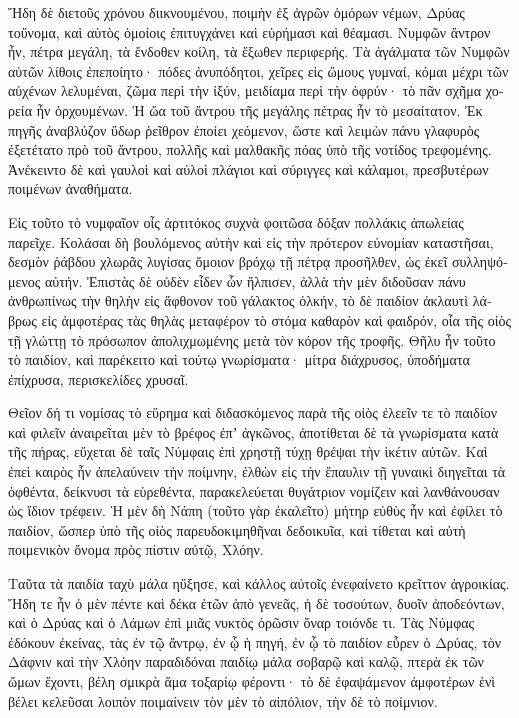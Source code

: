 \documentclass{book}
\begin{document}
\begin{pairs}
\begin{Leftside}
\begin{greek}
  Ἤδη δὲ διετοῦς χρόνου διικνουμένου, ποιμὴν ἐξ ἀγρῶν ὁμόρων νέμων, Δρύας τοὔνομα, καὶ αὐτὸς ὁμοίοις ἐπιτυγχάνει καὶ εὑρήμασι καὶ θέαμασι. Νυμφῶν ἄντρον ἦν, πέτρα μεγάλη, τὰ ἔνδοθεν κοίλη,  τὰ ἔξωθεν περιφερής. Τὰ ἀγάλματα τῶν Νυμφῶν αὐτῶν λίθοις ἐπεποίητο· πόδες ἀνυπόδητοι, χεῖρες εἰς ὤμους γυμναί, κόμαι μέχρι τῶν αὐχένων λελυμέναι, ζῶμα περὶ τὴν ἰξύν, μειδίαμα περὶ τὴν ὀφρύν· τὸ πᾶν σχῆμα χορεία ἦν ὀρχουμένων. Ἡ ὤα τοῦ ἄντρου τῆς μεγάλης πέτρας ἦν τὸ μεσαίτατον.  Ἐκ πηγῆς ἀναβλύζον ὕδωρ ῥεῖθρον ἐποίει χεόμενον, ὥστε καὶ λειμὼν πάνυ γλαφυρὸς ἐξετέτατο πρὸ τοῦ ἄντρου, πολλῆς καὶ μαλθακῆς πόας ὑπὸ τῆς νοτίδος τρεφομένης. Ἀνέκειντο δὲ καὶ γαυλοὶ καὶ αὐλοὶ πλάγιοι καὶ σύριγγες καὶ κάλαμοι, πρεσβυτέρων ποιμένων ἀναθήματα.
\pend


  Εἰς τοῦτο τὸ νυμφαῖον οἶς ἀρτιτόκος συχνὰ φοιτῶσα δόξαν πολλάκις ἀπωλείας παρεῖχε. Κολάσαι δὴ βουλόμενος αὐτὴν καὶ εἰς τὴν πρότερον εὐνομίαν καταστῆσαι, δεσμὸν ῥάβδου χλωρᾶς λυγίσας ὅμοιον βρόχῳ τῇ πέτρᾳ προσῆλθεν, ὡς ἐκεῖ συλληψόμενος αὐτήν.  Ἐπιστὰς δὲ οὐδὲν εἶδεν ὧν ἤλπισεν, ἀλλὰ τὴν μὲν διδοῦσαν πάνυ ἀνθρωπίνως τὴν θηλὴν εἰς ἄφθονον τοῦ γάλακτος ὁλκήν, τὸ δὲ παιδίον ἀκλαυτὶ λάβρως εἰς ἀμφοτέρας τὰς θηλὰς μεταφέρον τὸ στόμα καθαρὸν καὶ φαιδρόν, οἷα τῆς οἰὸς τῇ γλώττῃ τὸ πρόσωπον ἀπολιχμωμένης μετὰ τὸν κόρον τῆς τροφῆς.  Θῆλυ ἦν τοῦτο τὸ παιδίον, καὶ παρέκειτο καὶ τούτῳ γνωρίσματα· μίτρα διάχρυσος, ὑποδήματα ἐπίχρυσα, περισκελίδες χρυσαῖ.
\pend


  Θεῖον δή τι νομίσας τὸ εὕρημα καὶ διδασκόμενος παρὰ τῆς οἰὸς ἐλεεῖν τε τὸ παιδίον καὶ φιλεῖν ἀναιρεῖται μὲν τὸ βρέφος ἐπʼ ἀγκῶνος, ἀποτίθεται δὲ τὰ γνωρίσματα κατὰ τῆς πήρας, εὔχεται δὲ ταῖς Νύμφαις ἐπὶ χρηστῇ τύχῃ θρέψαι τὴν ἱκέτιν αὐτῶν.  Καὶ ἐπεὶ καιρὸς ἦν ἀπελαύνειν τὴν ποίμνην, ἐλθὼν εἰς τὴν ἔπαυλιν τῇ γυναικὶ διηγεῖται τὰ ὀφθέντα, δείκνυσι τὰ εὑρεθέντα, παρακελεύεται θυγάτριον νομίζειν καὶ λανθάνουσαν ὡς ἴδιον τρέφειν.  Ἡ μὲν δὴ Νάπη (τοῦτο γὰρ ἐκαλεῖτο) μήτηρ εὐθὺς ἦν καὶ ἐφίλει τὸ παιδίον, ὥσπερ ὑπὸ τῆς οἰὸς παρευδοκιμηθῆναι δεδοικυῖα, καὶ τίθεται καὶ αὐτὴ ποιμενικὸν ὄνομα πρὸς πίστιν αὐτῷ, Χλόην.
\pend


  Ταῦτα τὰ παιδία ταχὺ μάλα ηὔξησε, καὶ κάλλος αὐτοῖς ἐνεφαίνετο κρεῖττον ἀγροικίας. Ἤδη τε ἦν ὁ μὲν πέντε καὶ δέκα ἐτῶν ἀπὸ γενεᾶς, ἡ δὲ τοσούτων, δυοῖν ἀποδεόντων, καὶ ὁ Δρύας καὶ ὁ Λάμων ἐπὶ μιᾶς νυκτὸς ὁρῶσιν ὄναρ τοιόνδε τι.  Τὰς Νύμφας ἐδόκουν ἐκείνας, τὰς ἐν τῷ ἄντρῳ, ἐν ᾧ ἡ πηγή, ἐν ᾧ τὸ παιδίον εὗρεν ὁ Δρύας, τὸν Δάφνιν καὶ τὴν Χλόην παραδιδόναι παιδίῳ μάλα σοβαρῷ καὶ καλῷ, πτερὰ ἐκ τῶν ὤμων ἔχοντι, βέλη σμικρὰ ἅμα τοξαρίῳ φέροντι· τὸ δὲ ἐφαψάμενον ἀμφοτέρων ἑνὶ βέλει κελεῦσαι λοιπὸν ποιμαίνειν τὸν μὲν τὸ αἰπόλιον, τὴν δὲ τὸ ποίμνιον.
\pend



\end{greek}
\end{Leftside}
\end{pairs}
\end{document}
